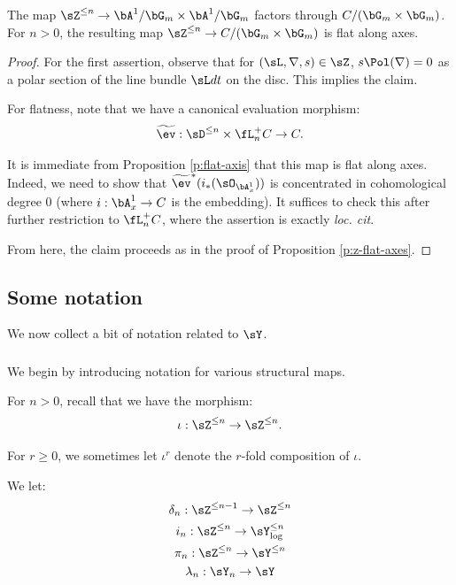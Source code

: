 \begin{prop}
\notready\label{p:z-flat-axes-var}

The map
$\sZ^{\leq n} \to \bA^1/\bG_m \times \bA^1/\bG_m$ factors
through $C/(\bG_m\times\bG_m)$. For $n>0$,
the resulting map
$\sZ^{\leq n} \to C/(\bG_m\times\bG_m)$ is flat along
axes.

\end{prop}

\begin{proof}

For the first assertion, observe that
for $(\sL,\nabla,s) \in \sZ$,
$s\Pol(\nabla) = 0$ as a polar section
of the line bundle $\sL dt$ on the disc.
This implies the claim.

For flatness, note that we
have a canonical evaluation morphism:
%
\[
\widetilde{\ev}:
\sD^{\leq n} \times \fL_n^+ C \to C.
\]

 It is immediate from
Proposition \ref{p:flat-axis} that this map
is flat along axes. Indeed, we need to show
that $\widetilde{\ev}^*(i_*(\sO_{\bA_x^1}))$
is concentrated in cohomological degree $0$
(where $i:\bA_x^1 \to C$ is the embedding).
It suffices to check this after further restriction
to $\fL_n^+ C$, where the assertion is
exactly \emph{loc. cit}.

From here, the claim proceeds as in the proof of
Proposition \ref{p:z-flat-axes}.

\end{proof}

\subsection{Some notation}\label{ss:y-not}

We now collect a bit of notation related
to $\sY$.

\subsubsection{}\label{sss:maps-notation}

We begin by introducing notation for various structural maps.

For $n>0$, recall that we have the morphism:
%
\[
\iota:\sZ^{\leq n} \to \sZ^{\leq n}.
\]

 For $r \geq 0$, we sometimes let $\iota^r$ denote the $r$-fold
composition of $\iota$.

We let:
%
\[
\begin{gathered}
\delta_n:\sZ^{\leq n-1} \to \sZ^{\leq n} \\
i_n:\sZ^{\leq n} \to \sY_{\log}^{\leq n} \\
\pi_n:\sZ^{\leq n} \to \sY^{\leq n} \\
\lambda_n:\sY_n \to \sY
\end{gathered}
\]

